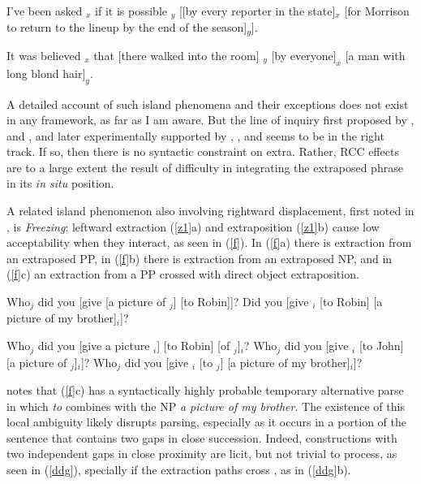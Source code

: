 \documentclass[output=paper]{langsci/langscibook}
\begin{document}
\ea \label{doubleex}
\ea I've been asked \spc$_x$ if it is possible \spc$_y$ [[by every reporter in the state]$_x$
 [for Morrison to return to the lineup by the end of the season]$_y$].\\
\citep{chavesrnr} \label{mine}

\ex \label{roch} \bad{*}It was believed \spc$_x$ that $[$there walked into the room$]$ \spc$_y$ $[$by everyone$]_x$ $[$a man with  long blond hair$]_y$.\\
\citep{rochemont}
\z
\z

A detailed account of such island phenomena and their exceptions does not exist in any framework, as far as I
am aware. But the line of inquiry first proposed by  \citet{grosurrc},  \citet{gazdar} and \citet{stucky},  and later experimentally supported by \citet{levyted}, \citet{strunk08}, and \citet{strunk} seems to be in the right track. If so, then there is no syntactic constraint on {\sc extra}. Rather, RCC effects are to a large extent the result of difficulty in integrating the extraposed phrase in its  {\it in situ} position.  

A related island phenomenon also involving rightward displacement, first noted in \citet[305]{Ross67short},
is {\it Freezing}: leftward extraction (\ref{z1}a) and extraposition (\ref{z1}b) cause low acceptability when they interact, as seen in (\ref{f}). In (\ref{f}a) there is extraction from an extraposed PP,  in (\ref{f}b)  there is extraction from an extraposed NP,  and  in (\ref{f}c) an extraction from a PP crossed with direct object extraposition. 
 
 
\ea 
\ea Who$_j$ did you [give [a picture of \spc$_j$] [to Robin]]?
\ex Did you [give \spc$_i$ [to Robin] [a picture of my brother]$_i$]?
\z \label{z1}
\z

\ea
\ea \bad{*}Who$_j$ did you [give a picture  \spc$_i$]  [to Robin] [of \spc$_j$]$_i$?    
\ex \bad{*}Who$_j$ did you [give \spc$_i$ [to John] [a picture of \spc$_j$]$_i$]? 
\ex \bad{*}Who$_j$ did you [give \spc$_i$ [to \spc$_j$] [a picture of my brother]$_i$]?
\z \label{f}
\z


  \citet[457]{fodor78} notes that (\ref{f}c) has a syntactically highly probable temporary alternative parse  in which \emph{to} combines with the NP \emph{a picture of my brother}. The existence of this local ambiguity  likely disrupts  parsing, especially as it occurs in a portion of the sentence that contains two gaps in close succession. Indeed, constructions with two independent gaps in close proximity  are licit, but not trivial to process, as seen in (\ref{ddg}), specially if the  extraction paths cross  \citep{fodor78}, as in (\ref{ddg}b).
\end{document}

